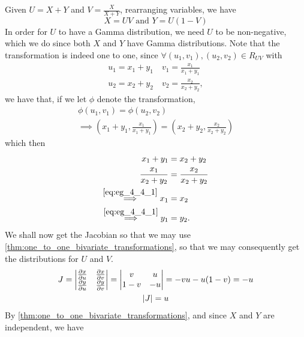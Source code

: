 \documentclass[notoc,notitlepage]{tufte-book}
\begin{document}
\begin{solution}
  Given $U = X + Y$ and $V = \frac{X}{X + Y}$, rearranging variables, we have
  \begin{equation*}
    X = UV \text{ and } Y = U ( 1 - V )
  \end{equation*}
  In order for $U$ to have a Gamma distribution, we need $U$ to be non-negative, which we do since both $X$ and $Y$ have Gamma distributions.
  Note that the transformation is indeed one to one, since $\forall (u_1, v_1), (u_2, v_2) \in R_{UV}$ with
  \begin{gather*}
    u_1 = x_1 + y_1 \quad v_1 = \frac{x_1}{x_1 + y_1} \\
    u_2 = x_2 + y_2 \quad v_2 = \frac{x_2}{x_2 + y_2},
  \end{gather*}
  we have that, if we let $\phi$ denote the transformation,
  \begin{gather*}
    \phi(u_1, v_1) = \phi(u_2, v_2) \\
    \implies \left( x_1 + y_1 , \frac{x_1}{x_1 + y_1} \right) = \left( x_2 + y_2, \frac{x_2}{x_2 + y_2} \right)
  \end{gather*}
  which then
  \begin{align}
    x_1 + y_1 &= x_2 + y_2 \label{eq:eg_4_4_1} \\
    \frac{x_1}{x_2 + y_2} &= \frac{x_2}{x_2 + y_2} \nonumber \\
    \overset{\cref{eq:eg_4_4_1}}{\implies} x_1 &= x_2 \nonumber \\
    \overset{\cref{eq:eg_4_4_1}}{\implies} y_1 &= y_2. \nonumber
  \end{align}
  We shall now get the Jacobian so that we may use \cref{thm:one_to_one_bivariate_transformations}, so that we may consequently get the distributions for $U$ and $V$.
  \begin{gather*}
    J = \begin{vmatrix}
      \frac{\partial x}{\partial u} & \frac{\partial x}{\partial v} \\
      \frac{\partial y}{\partial u} & \frac{\partial y}{\partial v}
    \end{vmatrix}
    = \begin{vmatrix}
      v     & u \\
      1 - v & -u
    \end{vmatrix}
    = -vu - u(1 - v) = -u \\
    \left|J\right| = u
  \end{gather*}
  By \cref{thm:one_to_one_bivariate_transformations}, and since $X$ and $Y$ are independent, we have

\end{solution}
\end{document}
